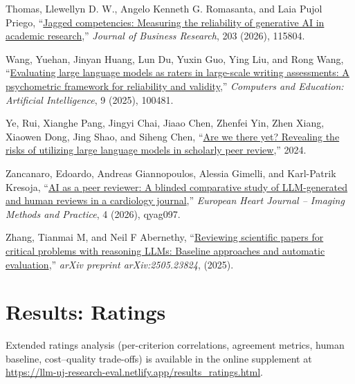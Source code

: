 \documentclass[
  11pt,
  letterpaper,
]{article}
\newlength{\cslhangindent}
\newenvironment{CSLReferences}[2] %
 {\begin{list}{}{%
  \setlength{\itemindent}{0pt}
  \setlength{\leftmargin}{0pt}
  \setlength{\parsep}{0pt}
  \ifodd #1
   \setlength{\leftmargin}{\cslhangindent}
   \setlength{\itemindent}{-1\cslhangindent}
  \fi
  \setlength{\itemsep}{#2\baselineskip}}}
 {\end{list}}
\begin{document}
\begin{CSLReferences}{1}{0}
Thomas, Llewellyn D. W., Angelo Kenneth G. Romasanta, and Laia Pujol
Priego, {``\href{https://doi.org/10.1016/j.jbusres.2025.115804}{Jagged
competencies: Measuring the reliability of generative AI in academic
research},''} \emph{Journal of Business Research}, 203 (2026), 115804.

Wang, Yuehan, Jinyan Huang, Lun Du, Yuxin Guo, Ying Liu, and Rong Wang,
{``\href{https://doi.org/10.1016/j.caeai.2025.100481}{Evaluating large
language models as raters in large-scale writing assessments: A
psychometric framework for reliability and validity},''} \emph{Computers
and Education: Artificial Intelligence}, 9 (2025), 100481.

Ye, Rui, Xianghe Pang, Jingyi Chai, Jiaao Chen, Zhenfei Yin, Zhen Xiang,
Xiaowen Dong, Jing Shao, and Siheng Chen,
{``\href{https://doi.org/10.48550/arXiv.2412.01708}{Are we there yet?
Revealing the risks of utilizing large language models in scholarly peer
review},''} 2024.

Zancanaro, Edoardo, Andreas Giannopoulos, Alessia Gimelli, and
Karl-Patrik Kresoja,
{``\href{https://doi.org/10.1093/ehjimp/qyag097}{{AI} as a peer
reviewer: A blinded comparative study of {LLM}-generated and human
reviews in a cardiology journal},''} \emph{European Heart Journal --
Imaging Methods and Practice}, 4 (2026), qyag097.

Zhang, Tianmai M, and Neil F Abernethy,
{``\href{https://arxiv.org/abs/2505.23824v2}{Reviewing scientific papers
for critical problems with reasoning LLMs: Baseline approaches and
automatic evaluation},''} \emph{arXiv preprint arXiv:2505.23824},
(2025).

\end{CSLReferences}

\cleardoublepage
{}
{}
\appendix

\section{Results: Ratings}\label{results-ratings}

Extended ratings analysis (per-criterion correlations, agreement
metrics, human baseline, cost--quality trade-offs) is available in the
online supplement at
\url{https://llm-uj-research-eval.netlify.app/results_ratings.html}.
\end{document}
